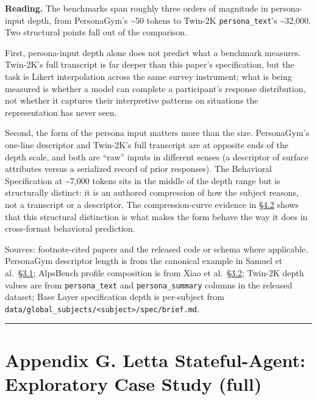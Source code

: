 \textbf{Reading.} The benchmarks span roughly three orders of magnitude
in persona-input depth, from PersonaGym's \textasciitilde50 tokens to
Twin-2K \texttt{persona\_text}'s \textasciitilde32,000. Two structural
points fall out of the comparison.

First, persona-input depth alone does not predict what a benchmark
measures. Twin-2K's full transcript is far deeper than this paper's
specification, but the task is Likert interpolation across the same
survey instrument; what is being measured is whether a model can
complete a participant's response distribution, not whether it captures
their interpretive patterns on situations the representation has never
seen.

Second, the form of the persona input matters more than the size.
PersonaGym's one-line descriptor and Twin-2K's full transcript are at
opposite ends of the depth scale, and both are ``raw'' inputs in
different senses (a descriptor of surface attributes versus a serialized
record of prior responses). The Behavioral Specification at
\textasciitilde7,000 tokens sits in the middle of the depth range but is
structurally distinct: it is an authored compression of how the subject
reasons, not a transcript or a descriptor. The compression-curve
evidence in \hyperref[compression-structure-vs.-raw-text]{§4.2} shows that this structural distinction is what makes
the form behave the way it does in cross-format behavioral prediction.

Sources: footnote-cited papers and the released code or schema where
applicable. PersonaGym descriptor length is from the canonical example
in Samuel et al.~\hyperref[operationalizing-representational-accuracy-via-the-behavioral-specification]{§3.1}; AlpsBench profile composition is from Xiao et
al.~\hyperref[experimental-conditions]{§3.2}; Twin-2K depth values are from \texttt{persona\_text} and
\texttt{persona\_summary} columns in the released dataset; Base Layer
specification depth is per-subject from
\texttt{data/global\_subjects/\textless{}subject\textgreater{}/spec/brief.md}.

\begin{center}\rule{0.5\linewidth}{0.5pt}\end{center}

\hypertarget{appendix-g.-letta-stateful-agent-exploratory-case-study-full}{%
\section{Appendix G. Letta Stateful-Agent: Exploratory Case Study
(full)}\label{appendix-g.-letta-stateful-agent-exploratory-case-study-full}}

